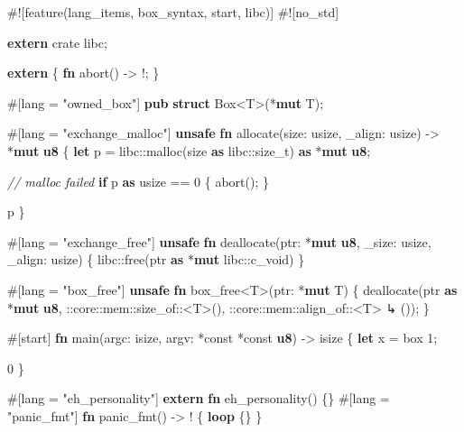 \documentclass[a4paper,]{book}
\newenvironment{Shaded}{\begin{snugshade}}{\end{snugshade}}
\newcommand{\KeywordTok}[1]{\textcolor[rgb]{0.13,0.29,0.53}{\textbf{{#1}}}}
\newcommand{\DecValTok}[1]{\textcolor[rgb]{0.00,0.00,0.81}{{#1}}}
\newcommand{\StringTok}[1]{\textcolor[rgb]{0.31,0.60,0.02}{{#1}}}
\newcommand{\CommentTok}[1]{\textcolor[rgb]{0.56,0.35,0.01}{\textit{{#1}}}}
\newcommand{\OtherTok}[1]{\textcolor[rgb]{0.56,0.35,0.01}{{#1}}}
\newcommand{\NormalTok}[1]{{#1}}
\begin{document}
\begin{Shaded}
\begin{Highlighting}[]
\NormalTok{#![feature(lang_items, box_syntax, start, libc)]}
\NormalTok{#![no_std]}

\KeywordTok{extern} \NormalTok{crate libc;}

\KeywordTok{extern} \NormalTok{\{}
    \KeywordTok{fn} \NormalTok{abort() -> !;}
\NormalTok{\}}

\OtherTok{#[}\NormalTok{lang }\OtherTok{=} \StringTok{"owned_box"}\OtherTok{]}
\KeywordTok{pub} \KeywordTok{struct} \NormalTok{Box<T>(*}\KeywordTok{mut} \NormalTok{T);}

\OtherTok{#[}\NormalTok{lang }\OtherTok{=} \StringTok{"exchange_malloc"}\OtherTok{]}
\KeywordTok{unsafe} \KeywordTok{fn} \NormalTok{allocate(size: usize, _align: usize) -> *}\KeywordTok{mut} \KeywordTok{u8} \NormalTok{\{}
    \KeywordTok{let} \NormalTok{p = libc::malloc(size }\KeywordTok{as} \NormalTok{libc::size_t) }\KeywordTok{as} \NormalTok{*}\KeywordTok{mut} \KeywordTok{u8}\NormalTok{;}

    \CommentTok{// malloc failed}
    \KeywordTok{if} \NormalTok{p }\KeywordTok{as} \NormalTok{usize == }\DecValTok{0} \NormalTok{\{}
        \NormalTok{abort();}
    \NormalTok{\}}

    \NormalTok{p}
\NormalTok{\}}

\OtherTok{#[}\NormalTok{lang }\OtherTok{=} \StringTok{"exchange_free"}\OtherTok{]}
\KeywordTok{unsafe} \KeywordTok{fn} \NormalTok{deallocate(ptr: *}\KeywordTok{mut} \KeywordTok{u8}\NormalTok{, _size: usize, _align: usize) \{}
    \NormalTok{libc::free(ptr }\KeywordTok{as} \NormalTok{*}\KeywordTok{mut} \NormalTok{libc::c_void)}
\NormalTok{\}}

\OtherTok{#[}\NormalTok{lang }\OtherTok{=} \StringTok{"box_free"}\OtherTok{]}
\KeywordTok{unsafe} \KeywordTok{fn} \NormalTok{box_free<T>(ptr: *}\KeywordTok{mut} \NormalTok{T) \{}
    \NormalTok{deallocate(ptr }\KeywordTok{as} \NormalTok{*}\KeywordTok{mut} \KeywordTok{u8}\NormalTok{, ::core::mem::size_of::<T>(), ::core::mem::align_of::<T>}
\NormalTok{↳ ());}
\NormalTok{\}}

\OtherTok{#[}\NormalTok{start}\OtherTok{]}
\KeywordTok{fn} \NormalTok{main(argc: isize, argv: *const *const }\KeywordTok{u8}\NormalTok{) -> isize \{}
    \KeywordTok{let} \NormalTok{x = box }\DecValTok{1}\NormalTok{;}

    \DecValTok{0}
\NormalTok{\}}

\OtherTok{#[}\NormalTok{lang }\OtherTok{=} \StringTok{"eh_personality"}\OtherTok{]} \KeywordTok{extern} \KeywordTok{fn} \NormalTok{eh_personality() \{\}}
\OtherTok{#[}\NormalTok{lang }\OtherTok{=} \StringTok{"panic_fmt"}\OtherTok{]} \KeywordTok{fn} \NormalTok{panic_fmt() -> ! \{ }\KeywordTok{loop} \NormalTok{\{\} \}}
\end{Highlighting}
\end{Shaded}
\end{document}
